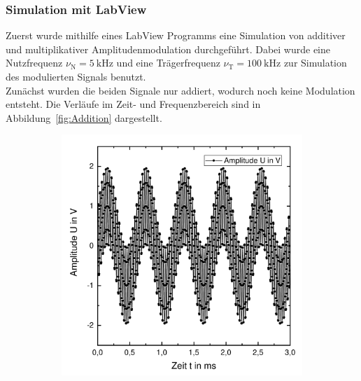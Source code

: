 \documentclass[a4paper,twoside,final]{article}
\begin{document}
\subsubsection{Simulation mit LabView}
Zuerst wurde mithilfe eines LabView Programms eine Simulation von additiver und multiplikativer Amplitudenmodulation durchgeführt. Dabei wurde eine Nutzfrequenz $\nu_\text{N} = \SI{5}{\kilo\hertz}$ und eine Trägerfrequenz $\nu_\text{T} = \SI{100}{\kilo\hertz}$ zur Simulation des modulierten Signals benutzt.\\
Zunächst wurden die beiden Signale nur addiert, wodurch noch keine Modulation entsteht. Die Verläufe im Zeit- und Frequenzbereich sind in Abbildung~\ref{fig:Addition} dargestellt.
\begin{figure}[htp]
    \centering
    \begin{subfigure}{0.45\textwidth}
        \includegraphics[width=\textwidth]{Bilder/Addition_Zeitverlauf.pdf}
    \end{subfigure}
    \begin{subfigure}{0.45\textwidth}

\end{subfigure}
\end{figure}
\end{document}
